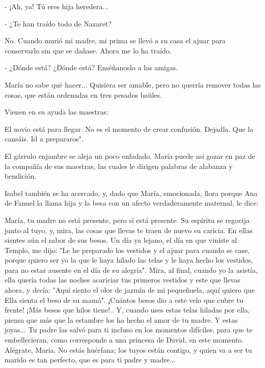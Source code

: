 \documentclass[12pt]{book} %
\begin{document}
- ¡Ah, ya! Tú eres hija heredera... 

- ¿Te han traído todo de Nazaret? 

No. Cuando murió mi madre, mi prima se llevó a su casa el ajuar para conservarlo sin que se dañase. Ahora me lo ha traído. 

- ¿Dónde está? ¿Dónde está? Enséñanoslo a las amigas. 

María no sabe qué hacer... Quisiera ser amable, pero no querría remover todas las cosas, que están ordenadas en tres pesados baúles. 

Vienen en su ayuda las maestras: 

El novio está para llegar. No es el momento de crear confusión. Dejadla. Que la cansáis. Id a prepararos". 

El gárrulo enjambre se aleja un poco enfadado. María puede así gozar en paz de la compañía de sus maestras, las cuales le dirigen palabras de alabanza y bendición. 

Isabel también se ha acercado, y, dado que María, emocionada, llora porque Ana de Fanuel la llama hija y la besa con un afecto verdaderamente maternal, le dice: 

María, tu madre no está presente, pero sí está presente. Su espíritu se regocija junto al tuyo, y, mira, las cosas que llevas te traen de nuevo su caricia. En ellas sientes aún el sabor de sus besos. Un día ya lejano, el día en que viniste al Templo, me dijo: "Le he preparado los vestidos y el ajuar para cuando se case, porque quiero ser yo la que le haya hilado las telas y le haya hecho los vestidos, para no estar ausente en el día de su alegría". Mira, al final, cuando yo la asistía, ella quería todas las noches acariciar tus primeros vestidos y este que llevas ahora, y decía: "Aquí siento el olor de jazmín de mi pequeñuela, aquí quiero que Ella sienta el beso de su mamá". ¡Cuántos besos dio a este velo que cubre tu frente! ¡Más besos que hilos tiene!.. Y, cuando uses estas telas hiladas por ella, piensa que más que la estambre los ha hecho el amor de tu madre. Y estas joyas... Tu padre las salvó para ti incluso en los momentos difíciles, para que te embellecieran, como corresponde a una princesa de David, en este momento. Alégrate, María. No estás huérfana; los tuyos están contigo, y quien va a ser tu marido es tan perfecto, que es para ti padre y madre... 
\end{document}
